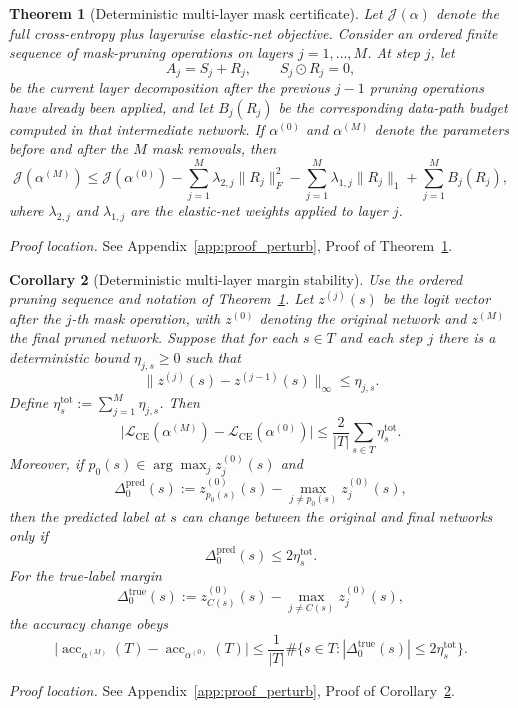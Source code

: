 \documentclass[11pt]{article}
\theoremstyle{plain}
\newtheorem{thm}{Theorem}[section]
\newtheorem{cor}[thm]{Corollary}
\theoremstyle{definition}
\theoremstyle{remark}
\newcommand{\acc}{\operatorname{acc}}
\newcommand{\1}{\mathbf{1}}
\newcommand{\proofloc}[1]{\par\noindent\emph{Proof location.} #1\par}
\begin{document}
\begin{thm}[Deterministic multi-layer mask certificate]
\label{thm:deterministic_multilayer_mask_certificate}
Let \(\mathcal J(\alpha)\) denote the full cross-entropy plus layerwise elastic-net objective. Consider an ordered finite sequence of mask-pruning operations on layers \(j=1,\dots,M\). At step \(j\), let
\[
A_j=S_j+R_j,
\qquad
S_j\odot R_j=0,
\]
be the current layer decomposition after the previous \(j-1\) pruning operations have already been applied, and let \(B_j(R_j)\) be the corresponding data-path budget computed in that intermediate network. If \(\alpha^{(0)}\) and \(\alpha^{(M)}\) denote the parameters before and after the \(M\) mask removals, then
\[
\mathcal J(\alpha^{(M)})
\le
\mathcal J(\alpha^{(0)})
-
\sum_{j=1}^M\lambda_{2,j}\|R_j\|_F^2
-
\sum_{j=1}^M\lambda_{1,j}\|R_j\|_1
+
\sum_{j=1}^M B_j(R_j),
\]
where \(\lambda_{2,j}\) and \(\lambda_{1,j}\) are the elastic-net weights applied to layer \(j\).
\end{thm}
\proofloc{See Appendix~\ref{app:proof_perturb}, Proof of Theorem~\ref{thm:deterministic_multilayer_mask_certificate}.}

\begin{cor}[Deterministic multi-layer margin stability]
\label{cor:deterministic_multilayer_margin_stability}
Use the ordered pruning sequence and notation of Theorem~\ref{thm:deterministic_multilayer_mask_certificate}. Let \(z^{(j)}(s)\) be the logit vector after the \(j\)-th mask operation, with \(z^{(0)}\) denoting the original network and \(z^{(M)}\) the final pruned network. Suppose that for each \(s\in T\) and each step \(j\) there is a deterministic bound \(\eta_{j,s}\ge0\) such that
\[
\|z^{(j)}(s)-z^{(j-1)}(s)\|_\infty\le \eta_{j,s}.
\]
Define \(\eta_s^{\mathrm{tot}}:=\sum_{j=1}^M\eta_{j,s}\). Then
\[
\big|\mathcal L_{\mathrm{CE}}(\alpha^{(M)})-\mathcal L_{\mathrm{CE}}(\alpha^{(0)})\big|
\le
\frac{2}{|T|}\sum_{s\in T}\eta_s^{\mathrm{tot}}.
\]
Moreover, if \(p_0(s)\in\arg\max_j z^{(0)}_j(s)\) and
\[
\Delta_0^{\mathrm{pred}}(s):=
z_{p_0(s)}^{(0)}(s)-\max_{j\ne p_0(s)}z_j^{(0)}(s),
\]
then the predicted label at \(s\) can change between the original and final networks only if
\[
\Delta_0^{\mathrm{pred}}(s)\le2\eta_s^{\mathrm{tot}}.
\]
For the true-label margin
\[
\Delta_0^{\mathrm{true}}(s):=
z_{C(s)}^{(0)}(s)-\max_{j\ne C(s)}z_j^{(0)}(s),
\]
the accuracy change obeys
\[
\big|\acc_{\alpha^{(M)}}(T)-\acc_{\alpha^{(0)}}(T)\big|
\le
\frac1{|T|}
\#\{s\in T:|\Delta_0^{\mathrm{true}}(s)|\le2\eta_s^{\mathrm{tot}}\}.
\]
\end{cor}
\proofloc{See Appendix~\ref{app:proof_perturb}, Proof of Corollary~\ref{cor:deterministic_multilayer_margin_stability}.}
\end{document}
